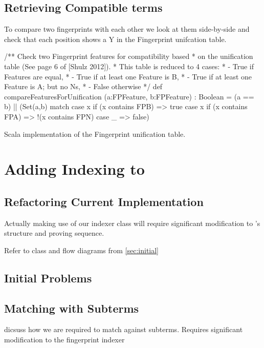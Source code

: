 \subsection{Retrieving Compatible terms}

To compare two fingerprints with each other we look at them side-by-side and check
that each position shows a Y in the Fingerprint unifcation table. 
\begin{listing}[H]
\begin{scalacode}
 /** Check two Fingerprint features for compatibility based
   * on the unification table (See page 6 of [Shulz 2012]).
   * This table is reduced to 4 cases:
   *  - True if Features are equal,
   *  - True if at least one Feature is B,
   *  - True if at least one Feature is A; but no Ns,
   *  - False otherwise  */
  def compareFeaturesForUnification
         (a:FPFeature, b:FPFeature) : Boolean =
  (a == b) || 
  (Set(a,b) match {
    case x if (x contains FPB) => true
    case x if (x contains FPA) => !(x contains FPN)
    case _ => false})
\end{scalacode}
\caption{Scala implementation of the Fingerprint unification table. \protect\cite[p6]{shulz12}}
\label{lst:unitable}
\end{listing}


\section{Adding Indexing to \Beagle}

\subsection{Refactoring Current Implementation}

Actually making use of our indexer class will require significant modification
to \beagle's structure and proving sequence.

Refer to class and flow diagrams from \ref{sec:initial}

\subsection{Initial Problems}

\subsection{Matching with Subterms}
dicsuss how we are required to match against subterms. Requires significant modification
to the fingerprint indexer

